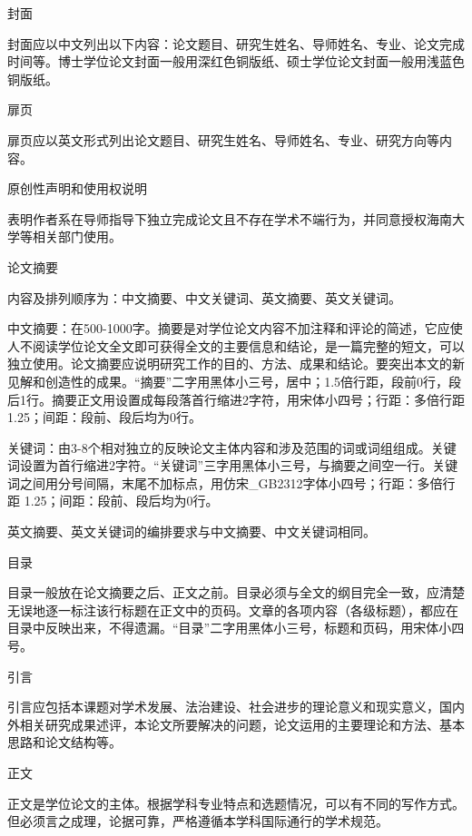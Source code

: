 \documentclass{hnuthesis}%
\begin{document}
\begin{asparaenum}
\item 封面

封面应以中文列出以下内容：论文题目、研究生姓名、导师姓名、专业、论文完成时间等。博士学位论文封面一般用深红色铜版纸、硕士学位论文封面一般用浅蓝色铜版纸。

\item 扉页

扉页应以英文形式列出论文题目、研究生姓名、导师姓名、专业、研究方向等内容。

\item 原创性声明和使用权说明

表明作者系在导师指导下独立完成论文且不存在学术不端行为，并同意授权海南大学等相关部门使用。

\item 论文摘要

内容及排列顺序为：中文摘要、中文关键词、英文摘要、英文关键词。

中文摘要：在500-1000字。摘要是对学位论文内容不加注释和评论的简述，它应使人不阅读学位论文全文即可获得全文的主要信息和结论，是一篇完整的短文，可以独立使用。论文摘要应说明研究工作的目的、方法、成果和结论。要突出本文的新见解和创造性的成果。“摘要”二字用黑体小三号，居中；1.5倍行距，段前0行，段后1行。摘要正文用设置成每段落首行缩进2字符，用宋体小四号；行距：多倍行距 1.25；间距：段前、段后均为0行。

关键词：由3-8个相对独立的反映论文主体内容和涉及范围的词或词组组成。关键词设置为首行缩进2字符。“关键词”三字用黑体小三号，与摘要之间空一行。关键词之间用分号间隔，末尾不加标点，用仿宋\_GB2312字体小四号；行距：多倍行距 1.25；间距：段前、段后均为0行。

英文摘要、英文关键词的编排要求与中文摘要、中文关键词相同。

\item 目录

目录一般放在论文摘要之后、正文之前。目录必须与全文的纲目完全一致，应清楚无误地逐一标注该行标题在正文中的页码。文章的各项内容（各级标题），都应在目录中反映出来，不得遗漏。“目录”二字用黑体小三号，标题和页码，用宋体小四号。

\item 引言

引言应包括本课题对学术发展、法治建设、社会进步的理论意义和现实意义，国内外相关研究成果述评，本论文所要解决的问题，论文运用的主要理论和方法、基本思路和论文结构等。

\item 正文

正文是学位论文的主体。根据学科专业特点和选题情况，可以有不同的写作方式。但必须言之成理，论据可靠，严格遵循本学科国际通行的学术规范。


\end{asparaenum}
\end{document}
